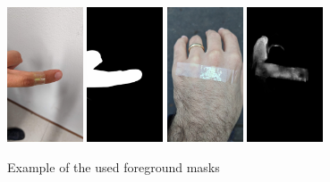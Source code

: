 \documentclass[10pt]{book}
\begin{document}
\begin{figure}
  \centering
     {\includegraphics[width=0.2\textwidth]{image/foreground_mask_example_finger}}
     {\includegraphics[width=0.2\textwidth]{image/foreground_mask_example_finger_mask}}
     {\includegraphics[width=0.2\textwidth]{image/foreground_mask_example_hand}}
     {\includegraphics[width=0.2\textwidth]{image/foreground_mask_example_hand_mask}}
  \caption{Example of the used foreground masks}
  \label{fig:foreground_mask_examples}
\end{figure}
\end{document}
